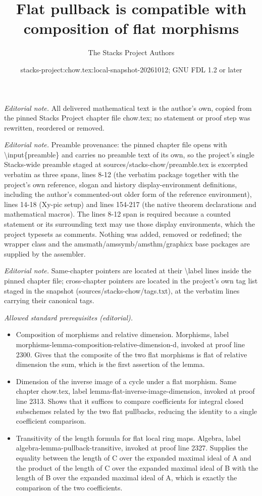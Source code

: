 \documentclass[10pt,a4paper]{amsart}
\title{Flat pullback is compatible with composition of flat morphisms}
\author{The Stacks Project Authors}
\date{stacks-project:chow.tex:local-snapshot-20261012; GNU FDL 1.2 or later}
\theoremstyle{plain}
\theoremstyle{definition}
\theoremstyle{remark}
\numberwithin{equation}{subsection}
\begin{document}
\maketitle
\noindent\textit{Editorial note.} All delivered mathematical text is the author's own, copied from the pinned Stacks Project chapter file chow.tex; no statement or proof step was rewritten, reordered or removed.\par\medskip
\noindent\textit{Editorial note.} Preamble provenance: the pinned chapter file opens with \textbackslash{}input\{preamble\} and carries no preamble text of its own, so the project's single Stacks-wide preamble staged at sources/stacks-chow/preamble.tex is excerpted verbatim as three spans, lines 8-12 (the verbatim package together with the project's own reference, slogan and history display-environment definitions, including the author's commented-out older form of the reference environment), lines 14-18 (Xy-pic setup) and lines 154-217 (the native theorem declarations and mathematical macros). The lines 8-12 span is required because a counted statement or its surrounding text may use those display environments, which the project typesets as comments. Nothing was added, removed or redefined; the wrapper class and the amsmath/amssymb/amsthm/graphicx base packages are supplied by the assembler.\par\medskip
\noindent\textit{Editorial note.} Same-chapter pointers are located at their \textbackslash{}label lines inside the pinned chapter file; cross-chapter pointers are located in the project's own tag list staged in the snapshot (sources/stacks-chow/tags.txt), at the verbatim lines carrying their canonical tags.\par\medskip
\noindent\textit{Allowed standard prerequisites (editorial).}\begin{itemize}
\item Composition of morphisms and relative dimension. Morphisms, label morphisms-lemma-composition-relative-dimension-d, invoked at proof line 2300. Gives that the composite of the two flat morphisms is flat of relative dimension the sum, which is the first assertion of the lemma.
\item Dimension of the inverse image of a cycle under a flat morphism. Same chapter chow.tex, label lemma-flat-inverse-image-dimension, invoked at proof line 2313. Shows that it suffices to compare coefficients for integral closed subschemes related by the two flat pullbacks, reducing the identity to a single coefficient comparison.
\item Transitivity of the length formula for flat local ring maps. Algebra, label algebra-lemma-pullback-transitive, invoked at proof line 2327. Supplies the equality between the length of C over the expanded maximal ideal of A and the product of the length of C over the expanded maximal ideal of B with the length of B over the expanded maximal ideal of A, which is exactly the comparison of the two coefficients.
\end{itemize}\medskip
\end{document}
